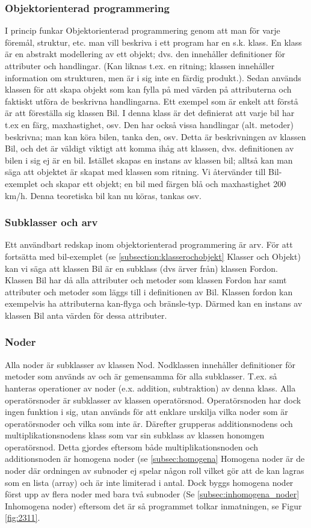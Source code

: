 \documentclass[12pt,a4paper]{article}
\begin{document}
\subsubsection{Objektorienterad programmering}
I princip funkar Objektorienterad programmering genom att man för varje föremål, struktur, etc. man vill beskriva i ett program har en s.k. klass. En klass är en abstrakt modellering av ett objekt; dvs. den innehåller definitioner för attributer och handlingar. (Kan liknas t.ex. en ritning; klassen innehåller information om strukturen, men är i sig inte en färdig produkt.). Sedan används klassen för att skapa objekt som kan fylla på med värden på attributerna och faktiskt utföra de beskrivna handlingarna. Ett exempel som är enkelt att förstå är att föreställa sig klassen Bil. I denna klass är det definierat att varje bil har t.ex en färg, maxhastighet, osv. Den har också vissa handlingar (alt. metoder) beskrivna; man kan köra bilen, tanka den, osv. Detta är beskrivningen av klassen Bil, och det är väldigt viktigt att komma ihåg att klassen, dvs. definitionen av bilen i sig ej är en bil. Istället skapas en instans av klassen bil; alltså kan man säga att objektet är skapat med klassen som ritning. Vi återvänder till Bil-exemplet och skapar ett objekt; en bil med färgen blå och maxhastighet 200 km/h. Denna teoretiska bil kan nu köras, tankas osv.
\subsubsection{Subklasser och arv}
Ett användbart redskap inom objektorienterad programmering är arv. För att fortsätta med bil-exemplet (se \ref{subsection:klasserochobjekt} Klasser och Objekt) kan vi säga att klassen Bil är en subklass (dvs ärver från) klassen Fordon. Klassen Bil har då alla attributer och metoder som klassen Fordon har samt attributer och metoder som läggs till i definitionen av Bil. Klassen fordon kan exempelvis ha attributerna kan-flyga och bränsle-typ. Därmed kan en instans av klassen Bil anta värden för dessa attributer.
\subsubsection{Noder}
Alla noder är subklasser av klassen Nod. Nodklassen innehåller definitioner för metoder som används av och är gemensamma för alla subklasser. T.ex. så hanteras operationer av noder (e.x. addition, subtraktion) av denna klass. Alla operatörsnoder är subklasser av klassen operatörsnod. Operatörsnoden har dock ingen funktion i sig, utan används för att enklare urskilja vilka noder som är operatörsnoder och vilka som inte är. Därefter grupperas additionsnodens och multiplikationsnodens klass som var sin subklass av klassen honomgen operatörsnod. Detta gjordes eftersom både multiplikationsnoden och additionsnoden är homogena noder (se \ref{subsec:homogena}
Homogena noder är de noder där ordningen av subnoder ej spelar någon roll vilket gör att de kan lagras som en lista (array) och är inte limiterad i antal. Dock byggs homogena noder först upp av flera noder med bara två subnoder (Se \ref{subsec:inhomogena_noder} Inhomogena noder) eftersom det är så programmet tolkar inmatningen, se Figur \ref{fig:2311}.
\end{document}
